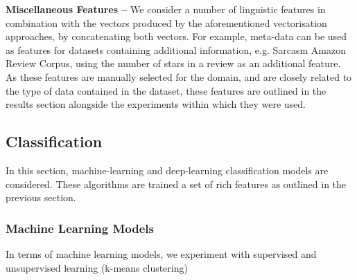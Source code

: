 \documentclass[12pt,a4paper]{article}
\begin{document}
\noindent \textbf{Miscellaneous Features --}
We consider a number of linguistic features in combination with the vectors produced by the aforementioned vectorisation approaches, by concatenating both vectors. For example, meta-data can be used as features for datasets containing additional information, e.g. Sarcasm Amazon Review Corpus, using the number of stars in a review as an additional feature. As these features are manually selected for the domain, and are closely related to the type of data contained in the dataset, these features are outlined in the results section alongside the experiments within which they were used.\\

\subsection{Classification}
\noindent 
In this section, machine-learning and deep-learning classification models are considered. These algorithms are trained a set of rich features as outlined in the previous section.

\subsubsection{Machine Learning Models}
In terms of machine learning models, we experiment with supervised and unsupervised learning (k-means clustering)
\end{document}
